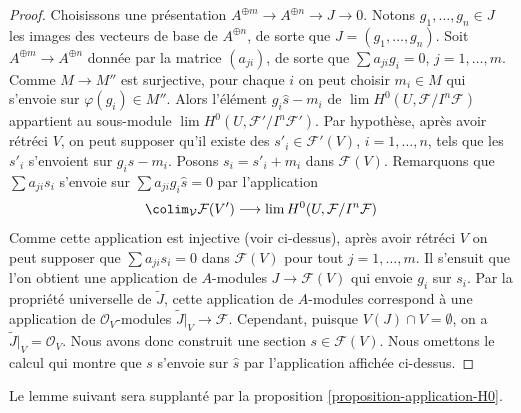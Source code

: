 \begin{proof}
\medskip\noindent
Choisissons une présentation $A^{\oplus m} \to A^{\oplus n} \to J \to 0$.
Notons $g_1, \ldots, g_n \in J$ les images des vecteurs de base
de $A^{\oplus n}$, de sorte que $J = (g_1, \ldots, g_n)$. Soit
$A^{\oplus m} \to A^{\oplus n}$ donnée par la matrice $(a_{ji})$,
de sorte que $\sum a_{ji} g_i = 0$, $j = 1, \ldots, m$.
Comme $M \to M''$ est surjective, pour chaque $i$ on peut choisir $m_i \in M$
qui s'envoie sur $\varphi(g_i) \in M''$. Alors l'élément $g_i \hat s - m_i$
de $\lim H^0(U, \mathcal{F}/I^n\mathcal{F})$ appartient au
sous-module $\lim H^0(U, \mathcal{F}'/I^n\mathcal{F}')$.
Par hypothèse, après avoir rétréci $V$, on peut supposer qu'il existe des
$s'_i \in \mathcal{F}'(V)$, $i = 1, \ldots, n$,
tels que les $s'_i$ s'envoient sur $g_i \hat s - m_i$.
Posons $s_i = s'_i + m_i$ dans $\mathcal{F}(V)$.
Remarquons que $\sum a_{ji} s_i$ s'envoie sur $\sum a_{ji}g_i\hat s = 0$
par l'application
$$
\colim_\mathcal{V} \mathcal{F}(V')
\longrightarrow
\lim H^0(U, \mathcal{F}/I^n\mathcal{F})
$$
Comme cette application est injective (voir ci-dessus), après avoir rétréci $V$ on peut supposer
que $\sum a_{ji}s_i = 0$ dans $\mathcal{F}(V)$ pour tout $j = 1, \ldots, m$.
Il s'ensuit que l'on obtient une application de $A$-modules $J \to \mathcal{F}(V)$
qui envoie $g_i$ sur $s_i$. Par la propriété universelle de $\widetilde{J}$,
cette application de $A$-modules correspond à une application de $\mathcal{O}_V$-modules
$\widetilde{J}|_V \to \mathcal{F}$. Cependant, puisque $V(J) \cap V = \emptyset$,
on a $\widetilde{J}|_V = \mathcal{O}_V$. Nous avons donc construit
une section $s \in \mathcal{F}(V)$. Nous omettons le calcul qui
montre que $s$ s'envoie sur $\hat s$ par l'application affichée ci-dessus.
\end{proof}

\noindent
Le lemme suivant sera supplanté par la
proposition \ref{proposition-application-H0}.

